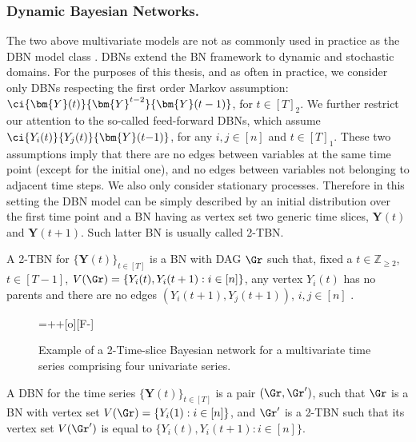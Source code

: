 \subsubsection{Dynamic Bayesian Networks.}
The two above multivariate models are not as commonly used in practice as the \gls{DBN} model class \citep{Murphy2002}. \glspl{DBN} extend the \gls{BN} framework to dynamic and stochastic domains. For the purposes of this thesis, and as often in practice, we consider only \glspl{DBN} respecting the first order Markov assumption: $\ci{\bm{Y}(t)}{\bm{Y}^{t-2}}{\bm{Y}(t-1)}$, for $t\in[T]_2$. We further restrict our attention  to the so-called feed-forward \glspl{DBN}, which assume $\ci{Y_i(t)}{Y_j(t)}{\bm{Y}(t{-1})}$, for any $i,j\in[n]$ and $t\in[T]_1$. These two assumptions imply that there are no edges between variables at the same time point (except for the initial one), and no edges between variables not belonging to adjacent time steps. We also only consider stationary processes. Therefore in this setting the \gls{DBN} model can be simply described by an initial distribution over the first time point and a \gls{BN} having as vertex set two generic time slices, $\bm{Y}(t)$ and $\bm{Y}(t+1)$. Such latter \gls{BN} is usually called \gls{2-TBN}.

\begin{definition}
\label{def:2-TBN}
A \gls{2-TBN} for $\{\bm{Y}(t)\}_{t\in[T]}$ is a \gls{BN} with \gls{DAG} $\Gr$ such that, fixed a $t\in\mathbb{Z}_{\geq 2}$, $t\in [T-1]$, $V(\Gr)=\{Y_i(t),Y_{i}(t+1):i\in[n]\}$, any vertex $Y_i(t)$ has no parents and there are no edges $(Y_{i}(t+1),Y_{j}(t+1))$, $i,j\in[n]$ .   
\end{definition} 
    
\begin{figure}
\centerline{
\entrymodifiers={++[o][F-]}
}
\caption{Example of a 2-Time-slice Bayesian network for a multivariate time series comprising four univariate series. \label{fig:2-TBN}}
\end{figure}

\begin{definition}
A \gls{DBN} for the time series $\{\bm{Y}(t)\}_{t\in[T]}$ is a pair $(\Gr,\Gr')$, such that $\Gr$ is a \gls{BN} with vertex set $V(\Gr)=\{Y_i(1):i\in[n]\}$, and $\Gr'$ is a \gls{2-TBN} such that its  vertex set $V(\Gr')$ is equal to $\{Y_i(t),Y_{i}(t+1):i\in[n]\}$.
\end{definition}

